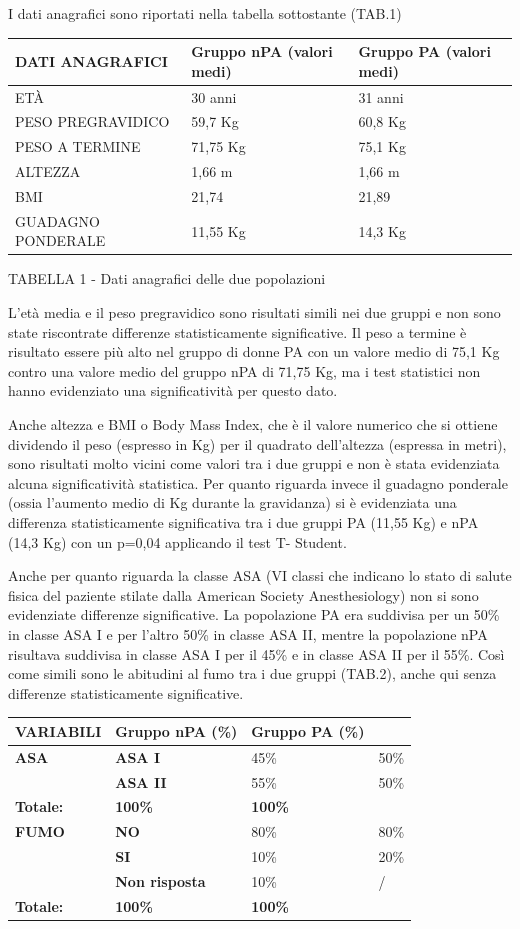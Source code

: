 \documentclass[]{article}
\begin{document}
I dati anagrafici sono riportati nella tabella sottostante (TAB.1)

\begin{longtable}[]{@{}lll@{}}
\toprule
\textbf{DATI ANAGRAFICI} & \textbf{Gruppo nPA (valori medi)} &
\textbf{Gruppo PA (valori medi)}\tabularnewline
\midrule
\endhead
ETÀ & 30 anni & 31 anni\tabularnewline
PESO PREGRAVIDICO & 59,7 Kg & 60,8 Kg\tabularnewline
PESO A TERMINE & 71,75 Kg & 75,1 Kg\tabularnewline
ALTEZZA & 1,66 m & 1,66 m\tabularnewline
BMI & 21,74 & 21,89\tabularnewline
GUADAGNO PONDERALE & 11,55 Kg & 14,3 Kg\tabularnewline
\bottomrule
\end{longtable}

TABELLA 1 - Dati anagrafici delle due popolazioni

L'età media e il peso pregravidico sono risultati simili nei due gruppi
e non sono state riscontrate differenze statisticamente significative.
Il peso a termine è risultato essere più alto nel gruppo di donne PA con
un valore medio di 75,1 Kg contro una valore medio del gruppo nPA di
71,75 Kg, ma i test statistici non hanno evidenziato una significatività
per questo dato.

Anche altezza e BMI o Body Mass Index, che è il valore numerico che si
ottiene dividendo il peso (espresso in Kg) per il quadrato dell'altezza
(espressa in metri), sono risultati molto vicini come valori tra i due
gruppi e non è stata evidenziata alcuna significatività statistica. Per
quanto riguarda invece il guadagno ponderale (ossia l'aumento medio di
Kg durante la gravidanza) si è evidenziata una differenza
statisticamente significativa tra i due gruppi PA (11,55 Kg) e nPA (14,3
Kg) con un p=0,04 applicando il test T- Student.

Anche per quanto riguarda la classe ASA (VI classi che indicano lo stato
di salute fisica del paziente stilate dalla American Society
Anesthesiology) non si sono evidenziate differenze significative. La
popolazione PA era suddivisa per un 50\% in classe ASA I e per l'altro
50\% in classe ASA II, mentre la popolazione nPA risultava suddivisa in
classe ASA I per il 45\% e in classe ASA II per il 55\%. Così come
simili sono le abitudini al fumo tra i due gruppi (TAB.2), anche qui
senza differenze statisticamente significative.

\begin{longtable}[]{@{}llll@{}}
\toprule
\textbf{VARIABILI} & \textbf{Gruppo nPA (\%)} & \textbf{Gruppo PA (\%)}
&\tabularnewline
\midrule
\endhead
\textbf{ASA} & \textbf{ASA I} & 45\% & 50\%\tabularnewline
& \textbf{ASA II} & 55\% & 50\%\tabularnewline
\textbf{Totale:} & \textbf{100\%} & \textbf{100\%} &\tabularnewline
\textbf{FUMO} & \textbf{NO} & 80\% & 80\%\tabularnewline
& \textbf{SI} & 10\% & 20\%\tabularnewline
& \textbf{Non risposta} & 10\% & /\tabularnewline
\textbf{Totale:} & \textbf{100\%} & \textbf{100\%} &\tabularnewline
\bottomrule
\end{longtable}
\end{document}
